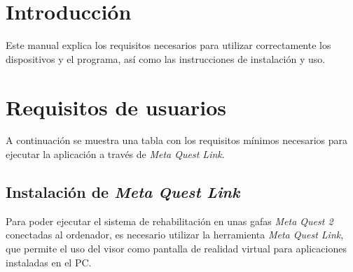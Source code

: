 \section{Introducción}
Este manual explica los requisitos necesarios para utilizar correctamente los dispositivos y el programa, así como las instrucciones de instalación y uso.
\section{Requisitos de usuarios}
A continuación se muestra una tabla con los requisitos mínimos necesarios para ejecutar la aplicación a través de \textit{Meta Quest Link}.
\begin{table}[H]
\centering
{}
\caption[Requisitos mínimos PC para Meta Quest Link]{Requisitos mínimos del sistema para ejecutar el proyecto mediante \textit{Meta Quest Link}.\cite{metaRequisitos}}
\label{tab:req-meta-quest-link}
\end{table}

\subsection{Instalación de \textit{Meta Quest Link}}

Para poder ejecutar el sistema de rehabilitación en unas gafas \textit{Meta Quest 2} conectadas al ordenador, es necesario utilizar la herramienta \textit{Meta Quest Link}, que permite el uso del visor como pantalla de realidad virtual para aplicaciones instaladas en el PC.


